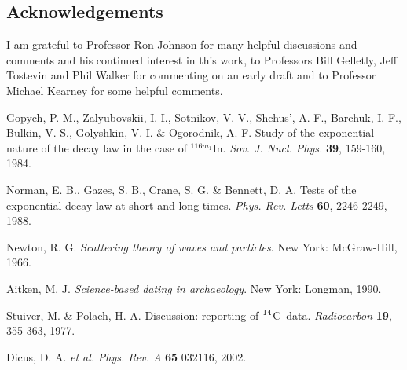 \documentclass[12pt]{article}
\newcommand{\cft}{$^{\rm 14}$C}
\begin{document}
\subsection*{Acknowledgements}
I am grateful to Professor Ron Johnson for many helpful discussions and 
comments and his continued interest in this work, to Professors Bill 
Gelletly, Jeff Tostevin 
and Phil Walker for commenting on an early draft and to Professor Michael 
Kearney for some helpful comments.

\begin{thebibliography}{9}

Gopych, P. M., Zalyubovskii, I. I., Sotnikov, V. V., Shchus', A. F.,
Barchuk, I. F., Bulkin, V. S., Golyshkin, V. I. \& Ogorodnik, A. F.
Study of the exponential nature of the decay law in the case of
$^{116m_1}$In.
{\em Sov. J. Nucl. Phys.} {\bf 39}, 159-160, 1984.

Norman, E. B., Gazes, S. B., Crane, S. G. \& Bennett, D. A.
Tests of the exponential decay law at short and long times.
{\em Phys. Rev. Letts} {\bf 60}, 2246-2249, 1988.

Newton, R. G.
{\em Scattering theory of waves and particles}.
New York: McGraw-Hill, 1966.

Aitken, M. J. 
{\em Science-based dating in archaeology}.
New York: Longman, 1990.

Stuiver, M. \& Polach, H. A.
Discussion: reporting of \cft~data.
{\em Radiocarbon} {\bf 19}, 355-363, 1977.

Dicus, D. A. {\em et al.}
{\em Phys. Rev. A} {\bf 65} 032116, 2002.


\end{thebibliography}
\end{document}
